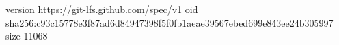 version https://git-lfs.github.com/spec/v1
oid sha256:c93c15778e3f87ad6d84947398f5f0fb1aeae39567ebed699e843ee24b305997
size 11068
